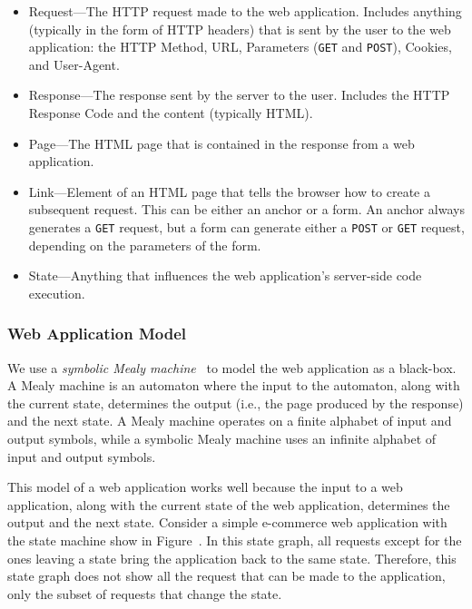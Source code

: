 \begin{itemize}

\item Request---The HTTP request made to the web application. Includes anything
  (typically in the form of HTTP headers) that is sent by the user to the web
  application: the HTTP Method, URL, Parameters (\texttt{GET} and \texttt{POST}), Cookies, and
  User-Agent.

\item Response---The response sent by the server to the user. Includes
  the HTTP Response Code and the content (typically HTML).

\item Page---The HTML page that is contained in the response from a web
  application.

\item Link---Element of an HTML page that tells the browser how to create a
  subsequent request. This can be either an anchor or a form. An anchor always
  generates a \texttt{GET} request, but a form can generate either a
  \texttt{POST} or \texttt{GET} request, depending on the parameters of the
  form.

\item State---Anything that influences the web application's server-side code execution.

\end{itemize}

\subsubsection{Web Application Model}



We use a \emph{symbolic Mealy machine}~\cite{berg08} to model the web
application as a black-box. A Mealy machine is an automaton where the input to
the automaton, along with the current state, determines the output (i.e., the
page produced by the response) and the next state. A Mealy machine operates on a
finite alphabet of input and output symbols, while a symbolic Mealy machine uses
an infinite alphabet of input and output symbols.

This model of a web application works well because the input to a web
application, along with the current state of the web application, determines
the output and the next state. Consider a simple e-commerce web application
with the state machine show in Figure~. In this
state graph, all requests except for the ones leaving a state bring the
application back to the same state. Therefore, this state graph does not show
all the request that can be made to the application, only the subset of
requests that change the state.


